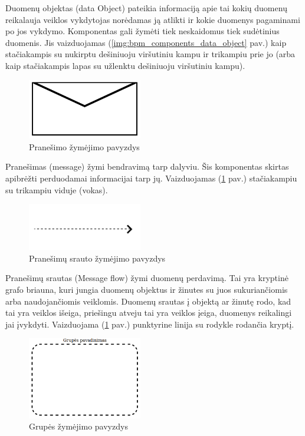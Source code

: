 \documentclass{VUMIFInfBakalaurinis}
\begin{document}
Duomenų objektas (data Object) pateikia informaciją apie tai kokių duomenų reikalauja veiklos vykdytojas norėdamas ją atlikti ir kokie duomenys pagaminami po jos vykdymo. Komponentas gali žymėti tiek neskaidomus tiek sudėtinius duomenis. Jis vaizduojamas (\ref{img:bpm_components_data_object} pav.) kaip stačiakampis su nukirptu dešiniuoju viršutiniu kampu ir trikampiu prie jo (arba kaip stačiakampis lapas su užlenktu dešiniuoju viršutiniu kampu). 

\begin{figure}[H]
	\centering
	\includegraphics[width=5cm]{img/bpm-components/message}
	\caption{Pranešimo žymėjimo pavyzdys}
	\label{img:bpm_components_message}
\end{figure}

Pranešimas (message) žymi bendravimą tarp dalyviu. Šis komponentas skirtas apibrėžti perduodamai informacijai tarp jų. Vaizduojamas (\ref{img:bpm_components_message} pav.) stačiakampiu su trikampiu viduje (vokas).

\begin{figure}[H]
	\centering
	\includegraphics[width=5cm]{img/bpm-components/message_flow}
	\caption{Pranešimų srauto žymėjimo pavyzdys}
	\label{img:bpm_components_message_flow}
\end{figure}

Pranešimų srautas (Message flow) žymi duomenų perdavimą. Tai yra kryptinė grafo briauna, kuri jungia duomenų objektus ir žinutes su juos sukuriančiomis arba naudojančiomis veiklomis. Duomenų srautas į objektą ar žinutę rodo, kad tai yra veiklos išeiga, priešingu atveju tai yra veiklos įeiga, duomenys reikalingi jai įvykdyti. Vaizduojama (\ref{img:bpm_components_message} pav.) punktyrine linija su rodykle rodančia kryptį.

\begin{figure}[H]
	\centering
	\includegraphics[width=5cm]{img/bpm-components/group}
	\caption{Grupės žymėjimo pavyzdys}
	\label{img:bpm_components_group}
\end{figure}
\end{document}
